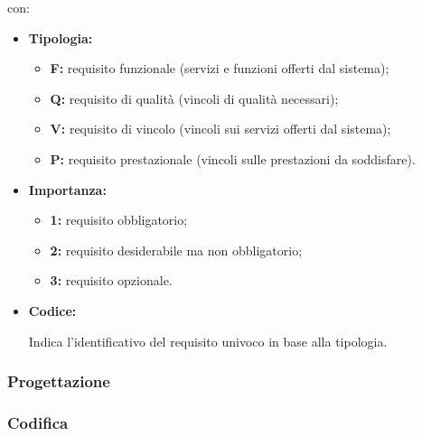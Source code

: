         con: 
        \begin{itemize}
            \item \textbf{Tipologia:}
                \begin{itemize}
                    \item \textbf{F:} requisito funzionale (servizi e funzioni offerti dal sistema);
                    \item \textbf{Q:} requisito di qualità (vincoli di qualità necessari);
                    \item \textbf{V:} requisito di vincolo (vincoli sui servizi offerti dal sistema);
                    \item \textbf{P:} requisito prestazionale (vincoli sulle prestazioni da soddisfare).
                \end{itemize}
                
            \item \textbf{Importanza:}
                \begin{itemize}
                    \item \textbf{1:} requisito obbligatorio;
                    \item \textbf{2:} requisito desiderabile ma non obbligatorio;
                    \item \textbf{3:} requisito opzionale.
                \end{itemize}
            \item \textbf{Codice:} 
                \par Indica l'identificativo del requisito univoco in base alla tipologia.
            
        \end{itemize}
        
        

    
        \subsubsection{Progettazione}
        \subsubsection{Codifica}



